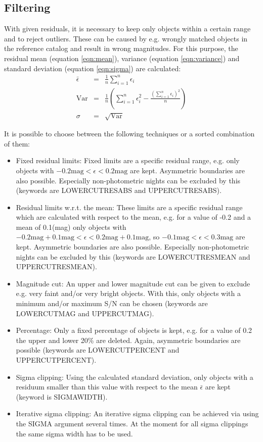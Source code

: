 \subsection{Filtering}
\label{subsec:Filtering}
With given residuals, it is necessary to keep only objects within a certain range and to reject outliers. These can be caused by e.g. wrongly matched objects in the reference catalog and result in wrong magnitudes. For this purpose, the residual mean (equation \ref{eqn:mean}), variance (equation \ref{eqn:variance}) and standard deviation (equation \ref{eqn:sigma}) are calculated:
\begin{eqnarray}
\bar \epsilon & = & \frac{1}{n} \sum_{i=1}^{n} \epsilon_{i}\label{eqn:mean}\\
\mathrm{Var} & = & \frac{1}{n} \left(\sum_{i=1}^{n} \epsilon_{i}^{2} - \frac{\left( \sum_{i=1}^{n} \epsilon_{i} \right)^{2}}{n} \right) \label{eqn:variance}\\
\sigma & = & \sqrt{\mathrm{Var}}\label{eqn:sigma}
\end{eqnarray}

It is possible to choose between the following techniques or a sorted combination of them:

\begin{itemize}
\item Fixed residual limits: Fixed limits are a specific residual range, e.g. only objects with $-0.2\text{mag} < \epsilon < 0.2\text{mag}$ are kept. Asymmetric boundaries are also possible. Especially non-photometric nights can be excluded by this (keywords are LOWERCUTRESABS and UPPERCUTRESABS).
\item Residual limits w.r.t. the mean: These limits are a specific residual range which are calculated with respect to the mean, e.g. for a value of -0.2 and a mean of 0.1(mag) only objects with $-0.2\text{mag}+0.1\text{mag} < \epsilon < 0.2\text{mag}+0.1\text{mag}$, so $-0.1\text{mag} < \epsilon < 0.3\text{mag}$ are kept. Asymmetric boundaries are also possible. Especially non-photometric nights can be excluded by this (keywords are LOWERCUTRESMEAN and UPPERCUTRESMEAN).
\item Magnitude cut: An upper and lower magnitude cut can be given to exclude e.g. very faint and/or very bright objects. With this, only objects with a minimum and/or maximum S/N can be chosen (keywords are LOWERCUTMAG and UPPERCUTMAG).
\item Percentage: Only a fixed percentage of objects is kept, e.g. for a value of 0.2 the upper and lower 20\% are deleted. Again, asymmetric boundaries are possible (keywords are LOWERCUTPERCENT and UPPERCUTPERCENT).
\item Sigma clipping: Using the calculated standard deviation, only objects with a residuum smaller than this value with respect to the mean $\bar \epsilon$ are kept (keyword is SIGMAWIDTH).
\item Iterative sigma clipping: An iterative sigma clipping can be achieved via using the SIGMA argument several times. At the moment for all sigma clippings the same sigma width has to be used.
\end{itemize}

